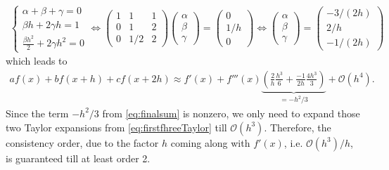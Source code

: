 \documentclass[12pt]{article}
\begin{document}
\begin{align}
	\begin{cases}
		\alpha + \beta + \gamma = 0 \\
		\beta h + 2 \gamma h =  1   \\
		\displaystyle \frac{\beta h^2}{2} + 2\gamma h^2 = 0
	\end{cases}
	\Leftrightarrow
	\begin{pmatrix}
		1 & 1   & 1 \\
		0 & 1   & 2 \\
		0 & 1/2 & 2
	\end{pmatrix}
	\begin{pmatrix}
		\alpha \\ \beta \\ \gamma
	\end{pmatrix}
	=
	\begin{pmatrix}
		0 \\ 1/h \\ 0
	\end{pmatrix}
	\Leftrightarrow
	\begin{pmatrix}
		\alpha \\ \beta \\ \gamma
	\end{pmatrix}
	=
	\begin{pmatrix}
		-3/(2h) \\ 2/h \\ -1/(2h)
	\end{pmatrix}
\end{align}
which leads to
\begin{align}
	\label{eq:finalsum}
	af(x) + bf(x+h) + cf(x+2h) 
	\approx
	f'(x) 
	+ f'''(x) \underbrace{\left( \frac{2}{h}\frac{h^3}{6}+\frac{-1}{2h}\frac{4h^3}{3}\right)}
	_{\displaystyle =-h^2/3}
	+ \mathcal{O}(h^4).
\end{align}
Since the term $-h^2/3$ from \eqref{eq:finalsum} is nonzero,
we only need to expand those two Taylor expansions from \eqref{eq:firstfhreeTaylor}
till $\mathcal{O}(h^3)$. Therefore, the consistency order, 
due to the factor $h$ coming along with $f'(x)$, i.e. $\mathcal{O}(h^3)/h$, is guaranteed till at least order 2.

\end{document}
